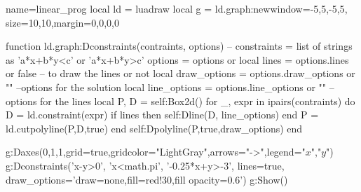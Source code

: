 \documentclass[]{standalone}
\begin{document}
\begin{luadraw}{name=linear_prog}
local ld = luadraw
local g = ld.graph:new{window={-5,5,-5,5}, size={10,10},margin={0,0,0,0}}

function ld.graph:Dconstraints(contraints, options)
-- constraints = list of strings as 'a*x+b*y<c' or 'a*x+b*y>c'
    options = options or {}
    local lines = options.lines or false -- to draw the lines or not
    local draw_options = options.draw_options or ""  --options for the solution
    local line_options = options.line_options or "" -- options for the lines
    local P, D = self:Box2d()
    for _, expr in ipairs(contraints) do
        D = ld.constraint(expr)
        if lines then self:Dline(D, line_options) end
        P = ld.cutpolyline(P,D,true)
    end
    self:Dpolyline(P,true,draw_options)
end

g:Daxes({0,1,1},{grid=true,gridcolor="LightGray",arrows="->",legend={"$x$","$y$"}})
g:Dconstraints({'x-y>0', 'x<math.pi', '-0.25*x+y>-3'}, 
    {lines=true, draw_options='draw=none,fill=red!30,fill opacity=0.6'})
g:Show()
\end{luadraw}
\end{document}

